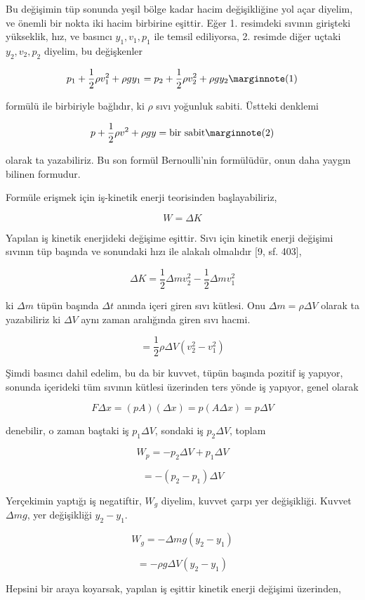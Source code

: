 \documentclass[12pt,fleqn]{article}\usepackage{../../common}
\begin{document}
Bu değişimin tüp sonunda yeşil bölge kadar hacim değişikliğine yol
açar diyelim, ve önemli bir nokta iki hacim birbirine eşittir.  Eğer
1. resimdeki sıvının girişteki yükseklik, hız, ve basıncı
$y_1,v_1,p_1$ ile temsil ediliyorsa, 2. resimde diğer uçtaki
$y_2,v_2,p_2$ diyelim, bu değişkenler

$$
p_1 + \frac{1}{2} \rho v_1^2 + \rho g y_1 =
p_2 + \frac{1}{2} \rho v_2^2 + \rho g y_2 
\mlabel{1}
$$

formülü ile birbiriyle bağlıdır, ki $\rho$ sıvı yoğunluk
sabiti. Üstteki denklemi

$$
p + \frac{1}{2} \rho v^2 + \rho g y = \textrm{bir sabit}
\mlabel{2}
$$

olarak ta yazabiliriz. Bu son formül Bernoulli'nin formülüdür, onun
daha yaygın bilinen formudur.

Formüle erişmek için iş-kinetik enerji teorisinden başlayabiliriz, 

$$
W = \Delta K
$$

Yapılan iş kinetik enerjideki değişime eşittir. Sıvı için kinetik enerji
değişimi sıvının tüp başında ve sonundaki hızı ile alakalı olmalıdır [9,
sf. 403],

$$
\Delta K = \frac{1}{2} \Delta m v_2^2 - \frac{1}{2} \Delta m v_1^2 
$$

ki $\Delta m$ tüpün başında $\Delta t$ anında içeri giren sıvı kütlesi. Onu
$\Delta m = \rho \Delta V$ olarak ta yazabiliriz ki $\Delta V$ aynı zaman
aralığında giren sıvı hacmi.

$$
= \frac{1}{2} \rho \Delta V(v_2^2 - v_1^2)
$$

Şimdi basıncı dahil edelim, bu da bir kuvvet, tüpün başında pozitif iş
yapıyor, sonunda içerideki tüm sıvının kütlesi üzerinden ters yönde iş
yapıyor, genel olarak 

$$
F \Delta x  = (pA)(\Delta x) = p(A\Delta x) = p \Delta V
$$

denebilir, o zaman baştaki iş $p_1 \Delta V$, sondaki iş $p_2 \Delta V$,
toplam

$$
W_p = -p_2 \Delta V + p_1 \Delta V
$$

$$
= - (p_2-p_1) \Delta V
$$

Yerçekimin yaptığı iş negatiftir, $W_g$ diyelim, kuvvet çarpı yer
değişikliği. Kuvvet $\Delta m g$, yer değişikliği $y_2-y_1$. 

$$
W_g = -\Delta m g (y_2 - y_1)
$$

$$
= -\rho g \Delta V (y_2-y_1)
$$


Hepsini bir araya koyarsak, yapılan iş eşittir kinetik enerji değişimi
üzerinden,
\end{document}
